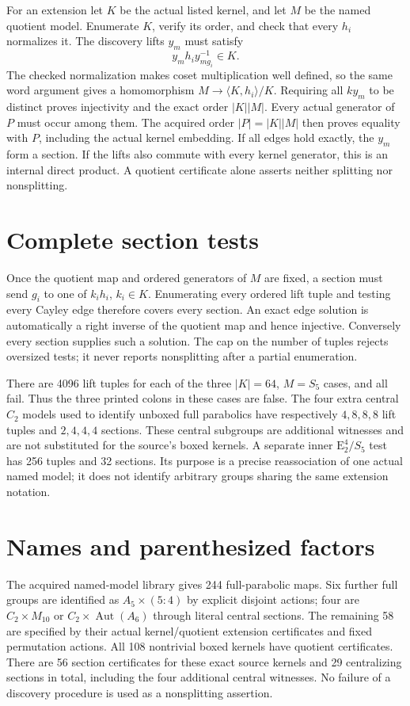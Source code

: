 \documentclass[10pt,a4paper]{article}
\newcommand{\E}{\mathrm E}\newcommand{\Aut}{\operatorname{Aut}}
\begin{document}
For an extension let $K$ be the actual listed kernel, and let $M$ be the
named quotient model. Enumerate $K$, verify its order, and check that every
$h_i$ normalizes it. The discovery lifts $y_m$ must satisfy
\[
 y_mh_i y_{mg_i}^{-1}\in K.
\]
The checked normalization makes coset multiplication well defined, so the
same word argument gives a homomorphism $M\to\langle K,h_i\rangle/K$.
Requiring all $ky_m$ to be distinct proves injectivity and the exact order
$|K||M|$. Every actual generator of $P$ must occur among them. The acquired
order $|P|=|K||M|$ then proves equality with $P$, including the actual
kernel embedding. If all edges hold exactly, the $y_m$ form a section.
If the lifts also commute with every kernel generator, this is an internal
direct product. A quotient certificate alone asserts neither splitting
nor nonsplitting.

\section*{Complete section tests}
Once the quotient map and ordered generators of $M$ are fixed, a section
must send $g_i$ to one of $k_i h_i$, $k_i\in K$. Enumerating every ordered
lift tuple and testing every Cayley edge therefore covers every section.
An exact edge solution is automatically a right inverse of the quotient
map and hence injective. Conversely every section supplies such a solution.
The cap on the number of tuples rejects oversized tests; it never reports
nonsplitting after a partial enumeration.

There are 4096 lift tuples for each of the three $|K|=64$, $M=S_5$ cases,
and all fail. Thus the three printed colons in these cases are false.
The four extra central $C_2$ models used to identify unboxed full parabolics
have respectively $4,8,8,8$ lift tuples and $2,4,4,4$ sections. These central
subgroups are additional witnesses and are not substituted for the source's
boxed kernels. A separate inner $\E_2^4/S_5$ test has 256 tuples and 32
sections. Its purpose is a precise reassociation of one actual named model;
it does not identify arbitrary groups sharing the same extension notation.

\section*{Names and parenthesized factors}
The acquired named-model library gives 244 full-parabolic maps. Six further
full groups are identified as $A_5\times(5:4)$ by explicit disjoint actions;
four are $C_2\times M_{10}$ or $C_2\times\Aut(A_6)$ through literal central
sections. The remaining 58 are specified by their actual kernel/quotient
extension certificates and fixed permutation actions. All 108 nontrivial
boxed kernels have quotient certificates. There are 56 section certificates
for these exact source kernels and 29 centralizing sections in total,
including the four additional central witnesses. No failure of a discovery
procedure is used as a nonsplitting assertion.
\end{document}
